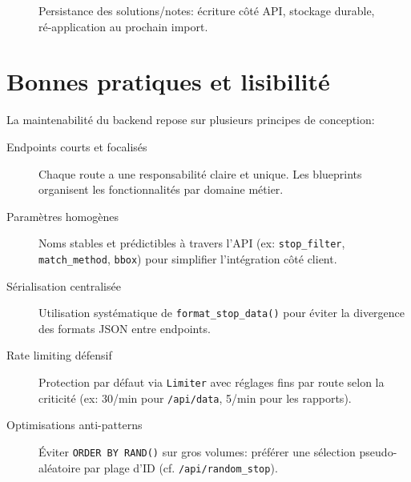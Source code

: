 \begin{figure}[H]
  \centering
  \caption[Cycle de persistance]{Persistance des solutions/notes: écriture côté API, stockage durable, ré-application au prochain import.}
\end{figure}

\section{Bonnes pratiques et lisibilité}

La maintenabilité du backend repose sur plusieurs principes de conception:

\begin{description}
  \item[Endpoints courts et focalisés] Chaque route a une responsabilité claire et unique. Les blueprints organisent les fonctionnalités par domaine métier.
  
  \item[Paramètres homogènes] Noms stables et prédictibles à travers l'API (ex: \texttt{stop\_filter}, \texttt{match\_method}, \texttt{bbox}) pour simplifier l'intégration côté client.
  
  \item[Sérialisation centralisée] Utilisation systématique de \texttt{format\_stop\_data()} pour éviter la divergence des formats JSON entre endpoints.
  
  \item[Rate limiting défensif] Protection par défaut via \texttt{Limiter} avec réglages fins par route selon la criticité (ex: 30/min pour \texttt{/api/data}, 5/min pour les rapports).
  
  \item[Optimisations anti-patterns] Éviter \texttt{ORDER BY RAND()} sur gros volumes: préférer une sélection pseudo-aléatoire par plage d'ID (cf. \texttt{/api/random\_stop}).
\end{description}

